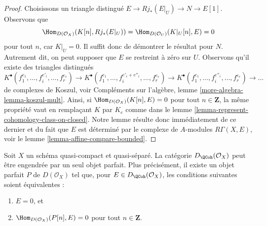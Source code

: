 \begin{proof}
Choisissons un triangle distingué $E \to Rj_*(E|_U) \to N \to E[1]$.
Observons que
$$
\Hom_{D(\mathcal{O}_X)}(K[n], Rj_*(E|_U)) =
\Hom_{D(\mathcal{O}_U)}(K|_U[n], E) = 0
$$
pour tout $n$, car $K|_U = 0$. Il suffit donc de démontrer le résultat pour
$N$. Autrement dit, on peut supposer que $E$ se restreint à zéro sur $U$.
Observons qu'il existe des triangles distingués
$$
K^\bullet(f_1^{e_1}, \ldots, f_i^{e'_i}, \ldots, f_r^{e_r}) \to
K^\bullet(f_1^{e_1}, \ldots, f_i^{e'_i + e''_i}, \ldots, f_r^{e_r}) \to
K^\bullet(f_1^{e_1}, \ldots, f_i^{e''_i}, \ldots, f_r^{e_r}) \to \ldots
$$
de complexes de Koszul, voir
Compléments sur l'algèbre, lemme \ref{more-algebra-lemma-koszul-mult}.
Ainsi, si $\Hom_{D(\mathcal{O}_X)}(K[n], E) = 0$ pour tout $n \in \mathbf{Z}$,
la même propriété vaut en remplaçant $K$ par
$K_e$ comme dans le lemme \ref{lemma-represent-cohomology-class-on-closed}.
Notre lemme résulte donc immédiatement de ce dernier et du fait que $E$
est déterminé par le complexe de $A$-modules $R\Gamma(X, E)$, voir le
lemme \ref{lemma-affine-compare-bounded}.
\end{proof}

\begin{theorem}
\label{theorem-bondal-van-den-Bergh}
Soit $X$ un schéma quasi-compact et quasi-séparé. La catégorie
$D_\QCoh(\mathcal{O}_X)$ peut être engendrée par un seul
objet parfait. Plus précisément, il existe un objet parfait
$P$ de $D(\mathcal{O}_X)$ tel que, pour
$E \in D_\QCoh(\mathcal{O}_X)$, les conditions suivantes soient équivalentes :
\begin{enumerate}
\item $E = 0$, et
\item $\Hom_{D(\mathcal{O}_X)}(P[n], E) = 0$ pour tout $n \in \mathbf{Z}$.
\end{enumerate}
\end{theorem}

